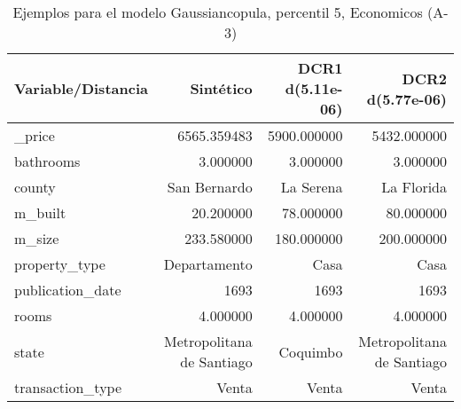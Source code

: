 \begin{table}[H]
\centering
\fontsize{10}{14}\selectfont
\caption{Ejemplos para el modelo Gaussiancopula, percentil 5, Economicos (A-3)}
\label{table-example-economicos-a-3-gaussiancopula-5p}
\begin{tabular}{|l|r|r|r|}
\hline
\rowcolor[gray]{0.8}
Variable/Distancia & Sintético & DCR1 d(5.11e-06) & DCR2 d(5.77e-06) \\
\hline \_price & \cellcolor[rgb]{0.9, 0.54, 0.52} 6565.359483 & 5900.000000 & 5432.000000 \\
\hline bathrooms & \cellcolor[rgb]{0.9, 0.54, 0.52} 3.000000 & \cellcolor[rgb]{0.9, 0.54, 0.52} 3.000000 & \cellcolor[rgb]{0.9, 0.54, 0.52} 3.000000 \\
\hline county & \cellcolor[rgb]{0.9, 0.54, 0.52} San Bernardo & La Serena & La Florida \\
\hline m\_built & \cellcolor[rgb]{0.9, 0.54, 0.52} 20.200000 & 78.000000 & 80.000000 \\
\hline m\_size & \cellcolor[rgb]{0.9, 0.54, 0.52} 233.580000 & 180.000000 & 200.000000 \\
\hline property\_type & \cellcolor[rgb]{0.9, 0.54, 0.52} Departamento & Casa & Casa \\
\hline publication\_date & \cellcolor[rgb]{0.9, 0.54, 0.52} 1693 & \cellcolor[rgb]{0.9, 0.54, 0.52} 1693 & \cellcolor[rgb]{0.9, 0.54, 0.52} 1693 \\
\hline rooms & \cellcolor[rgb]{0.9, 0.54, 0.52} 4.000000 & \cellcolor[rgb]{0.9, 0.54, 0.52} 4.000000 & \cellcolor[rgb]{0.9, 0.54, 0.52} 4.000000 \\
\hline state & \cellcolor[rgb]{0.9, 0.54, 0.52} Metropolitana de Santiago & Coquimbo & \cellcolor[rgb]{0.9, 0.54, 0.52} Metropolitana de Santiago \\
\hline transaction\_type & \cellcolor[rgb]{0.9, 0.54, 0.52} Venta & \cellcolor[rgb]{0.9, 0.54, 0.52} Venta & \cellcolor[rgb]{0.9, 0.54, 0.52} Venta \\
\hline
\end{tabular}
\end{table}
